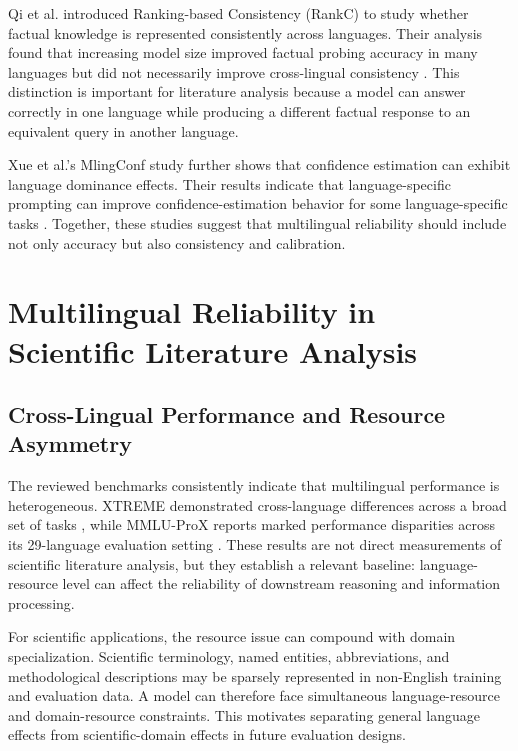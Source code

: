 \documentclass[acmsmall,screen,review]{acmart}
\begin{document}
Qi et al. introduced Ranking-based Consistency (RankC) to study whether factual knowledge is represented consistently across languages. Their analysis found that increasing model size improved factual probing accuracy in many languages but did not necessarily improve cross-lingual consistency \citep{qi2023crosslingual}. This distinction is important for literature analysis because a model can answer correctly in one language while producing a different factual response to an equivalent query in another language.

Xue et al.'s MlingConf study further shows that confidence estimation can exhibit language dominance effects. Their results indicate that language-specific prompting can improve confidence-estimation behavior for some language-specific tasks \citep{xue2024mlingconf}. Together, these studies suggest that multilingual reliability should include not only accuracy but also consistency and calibration.


\section{Multilingual Reliability in Scientific Literature Analysis}
\label{sec:reliability}


\subsection{Cross-Lingual Performance and Resource Asymmetry}
\label{sec:resource-asymmetry}

The reviewed benchmarks consistently indicate that multilingual performance is heterogeneous. XTREME demonstrated cross-language differences across a broad set of tasks \citep{hu2020xtreme}, while MMLU-ProX reports marked performance disparities across its 29-language evaluation setting \citep{xuan2025mmlupro}. These results are not direct measurements of scientific literature analysis, but they establish a relevant baseline: language-resource level can affect the reliability of downstream reasoning and information processing.

For scientific applications, the resource issue can compound with domain specialization. Scientific terminology, named entities, abbreviations, and methodological descriptions may be sparsely represented in non-English training and evaluation data. A model can therefore face simultaneous language-resource and domain-resource constraints. This motivates separating general language effects from scientific-domain effects in future evaluation designs.
\end{document}
